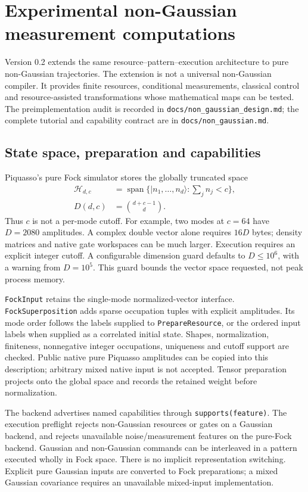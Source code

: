 \section{Experimental non-Gaussian measurement computations}
\label{sec:nonGaussian}

Version 0.2 extends the same resource--pattern--execution architecture to pure
non-Gaussian trajectories. The extension is not a universal non-Gaussian
compiler. It provides finite resources, conditional measurements, classical
control and resource-assisted transformations whose mathematical maps can be
tested. The preimplementation audit is recorded in
\texttt{docs/non\_gaussian\_design.md}; the complete tutorial and capability
contract are in \texttt{docs/non\_gaussian.md}.

\subsection{State space, preparation and capabilities}

Piquasso's pure Fock simulator stores the globally truncated space
\begin{align}
 \mathcal H_{d,c}&=\operatorname{span}\{
 |n_1,\ldots,n_d\rangle:\textstyle\sum_jn_j<c\},\\
 D(d,c)&=\binom{d+c-1}{d}.
\end{align}
Thus $c$ is not a per-mode cutoff. For example, two modes at $c=64$ have
$D=2080$ amplitudes. A complex double vector alone requires $16D$ bytes;
density matrices and native gate workspaces can be much larger. Execution
requires an explicit integer cutoff. A configurable dimension guard defaults
to $D\leq10^6$, with a warning from $D=10^5$. This guard bounds the vector
space requested, not peak process memory.

\texttt{FockInput} retains the single-mode normalized-vector interface.
\texttt{FockSuperposition} adds sparse occupation tuples with explicit
amplitudes. Its mode order follows the labels supplied to
\texttt{PrepareResource}, or the ordered input labels when supplied as a
correlated initial state. Shapes, normalization, finiteness, nonnegative integer
occupations, uniqueness and cutoff support are checked. Public native pure
Piquasso amplitudes can be copied into this description; arbitrary mixed
native input is not accepted. Tensor preparation projects onto the global
space and records the retained weight before normalization.

The backend advertises named capabilities through \texttt{supports(feature)}.
The execution preflight rejects non-Gaussian resources or gates on a Gaussian
backend, and rejects unavailable noise/measurement features on the pure-Fock
backend. Gaussian and non-Gaussian commands can be interleaved in a pattern
executed wholly in Fock space. There is no implicit representation switching.
Explicit pure Gaussian inputs are converted to Fock preparations; a mixed
Gaussian covariance requires an unavailable mixed-input implementation.

